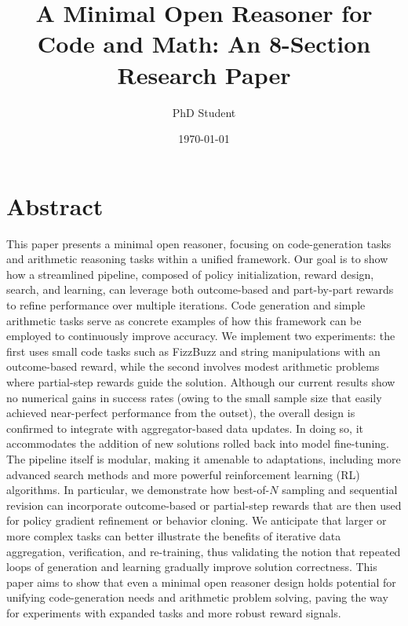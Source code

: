 \documentclass{article}
\title{A Minimal Open Reasoner for Code and Math: An 8-Section Research Paper}
\author{PhD Student}
\date{\today}
\begin{document}
\maketitle

\section{Abstract}
This paper presents a minimal open reasoner, focusing on code-generation tasks and arithmetic reasoning tasks within a unified framework. Our goal is to show how a streamlined pipeline, composed of policy initialization, reward design, search, and learning, can leverage both outcome-based and part-by-part rewards to refine performance over multiple iterations. Code generation and simple arithmetic tasks serve as concrete examples of how this framework can be employed to continuously improve accuracy. We implement two experiments: the first uses small code tasks such as FizzBuzz and string manipulations with an outcome-based reward, while the second involves modest arithmetic problems where partial-step rewards guide the solution. Although our current results show no numerical gains in success rates (owing to the small sample size that easily achieved near-perfect performance from the outset), the overall design is confirmed to integrate with aggregator-based data updates. In doing so, it accommodates the addition of new solutions rolled back into model fine-tuning. The pipeline itself is modular, making it amenable to adaptations, including more advanced search methods and more powerful reinforcement learning (RL) algorithms. In particular, we demonstrate how best-of-\(N\) sampling and sequential revision can incorporate outcome-based or partial-step rewards that are then used for policy gradient refinement or behavior cloning. We anticipate that larger or more complex tasks can better illustrate the benefits of iterative data aggregation, verification, and re-training, thus validating the notion that repeated loops of generation and learning gradually improve solution correctness. This paper aims to show that even a minimal open reasoner design holds potential for unifying code-generation needs and arithmetic problem solving, paving the way for experiments with expanded tasks and more robust reward signals.
\end{document}
